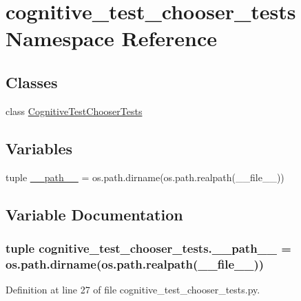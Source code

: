 \hypertarget{namespacecognitive__test__chooser__tests}{\section{cognitive\-\_\-test\-\_\-chooser\-\_\-tests Namespace Reference}
\label{namespacecognitive__test__chooser__tests}
}
\subsection*{Classes}
\begin{DoxyCompactItemize}
\item 
class \hyperlink{classcognitive__test__chooser__tests_1_1CognitiveTestChooserTests}{Cognitive\-Test\-Chooser\-Tests}
\end{DoxyCompactItemize}
\subsection*{Variables}
\begin{DoxyCompactItemize}
\item 
tuple \hyperlink{namespacecognitive__test__chooser__tests_a9ff9da1be84908e185009dc91a513f8e}{\-\_\-\-\_\-path\-\_\-\-\_\-} = os.\-path.\-dirname(os.\-path.\-realpath(\-\_\-\-\_\-file\-\_\-\-\_\-))
\end{DoxyCompactItemize}


\subsection{Variable Documentation}
\hypertarget{namespacecognitive__test__chooser__tests_a9ff9da1be84908e185009dc91a513f8e}{
\subsubsection[{\-\_\-\-\_\-path\-\_\-\-\_\-}]{\setlength{\rightskip}{0pt plus 5cm}tuple cognitive\-\_\-test\-\_\-chooser\-\_\-tests.\-\_\-\-\_\-path\-\_\-\-\_\- = os.\-path.\-dirname(os.\-path.\-realpath(\-\_\-\-\_\-file\-\_\-\-\_\-))}}\label{namespacecognitive__test__chooser__tests_a9ff9da1be84908e185009dc91a513f8e}


Definition at line 27 of file cognitive\-\_\-test\-\_\-chooser\-\_\-tests.\-py.

